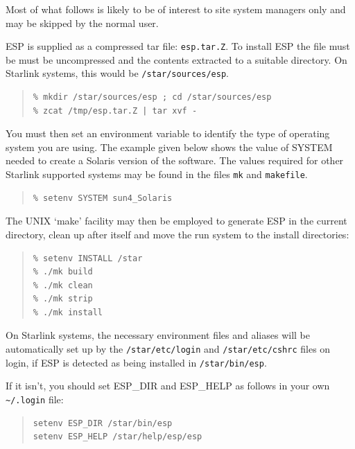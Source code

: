 \documentclass[twoside,11pt]{article}
\newenvironment{myquote}{\begin{quote}\begin{small}}{\end{small}\end{quote}}
\begin{document}
Most of what follows is likely to be of interest to site system managers only 
and may be skipped by the normal user.

ESP is supplied as a compressed tar file: {\tt esp.tar.Z}. To install ESP 
the file must be must be uncompressed and the contents extracted to a
suitable directory.  On Starlink systems, this would be {\tt /star/sources/esp}.

\begin{myquote}
\begin{verbatim}
% mkdir /star/sources/esp ; cd /star/sources/esp
% zcat /tmp/esp.tar.Z | tar xvf -
\end{verbatim}
\end{myquote}

You must then set an environment variable to identify the type of
operating system you are using. The example given below shows the value
of SYSTEM needed to create a Solaris version of the software. The values
required for other Starlink supported systems may be found in the files
{\tt mk} and {\tt makefile}.

\begin{myquote}
\begin{verbatim}
% setenv SYSTEM sun4_Solaris
\end{verbatim}
\end{myquote}

The UNIX `make' facility may then be employed to generate ESP in the
current directory, clean up after itself and move the run system to the
install directories:

\begin{myquote}
\begin{verbatim}
% setenv INSTALL /star
% ./mk build
% ./mk clean
% ./mk strip
% ./mk install
\end{verbatim}
\end{myquote}

On Starlink systems, the necessary environment files and aliases will
be automatically set up by the {\tt /star/etc/login} and {\tt /star/etc/cshrc}
files on login, if ESP is detected as being installed in {\tt /star/bin/esp}.

If it isn't, you should set ESP\_DIR and ESP\_HELP as follows in your own 
{\verb+ ~/.login+} file:

\begin{myquote}
\begin{verbatim}
setenv ESP_DIR /star/bin/esp
setenv ESP_HELP /star/help/esp/esp
\end{verbatim}
\end{myquote}
\end{document}
